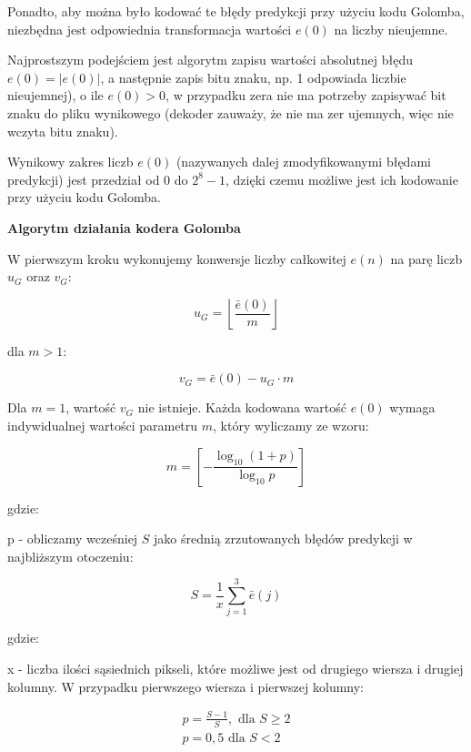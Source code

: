 \documentclass{article}
\begin{document}
Ponadto, aby można było kodować te błędy predykcji przy użyciu kodu Golomba, niezbędna jest odpowiednia transformacja wartości $e(0)$ na liczby nieujemne.

Najprostszym podejściem jest algorytm zapisu wartości absolutnej błędu $e(0)=|e(0)|$, a następnie zapis bitu znaku, np. 1 odpowiada liczbie nieujemnej), o ile $e(0)>0$, w przypadku zera nie ma potrzeby zapisywać bit znaku do pliku wynikowego (dekoder zauważy, że nie ma zer ujemnych, więc nie wczyta bitu znaku).

Wynikowy zakres liczb $e(0)$ (nazywanych dalej zmodyfikowanymi błędami predykcji) jest przedział od $0$ do $2^8 - 1$, dzięki czemu możliwe jest ich kodowanie przy użyciu kodu Golomba.


\textbf{Algorytm działania kodera Golomba}

W pierwszym kroku wykonujemy konwersje liczby całkowitej $e(n)$ na parę liczb $u_G$ oraz $v_G$:
  
\begin{equation}
u_{G}=\left\lfloor\frac{\bar{e}(0)}{m}\right\rfloor
\end{equation}	
  
dla $m > 1$:
  
\begin{equation}
v_{G}=\bar{e}(0)-u_{G} \cdot m
\end{equation}	
  
Dla $m = 1$, wartość $v_G$ nie istnieje. Każda kodowana wartość $e(0)$ wymaga indywidualnej wartości parametru $m$, który wyliczamy ze wzoru:
  
\begin{equation}
m=\left[-\frac{\log_{10}(1+p)}{\log_{10} p}\right]
\end{equation}
  
gdzie:

p - obliczamy wcześniej $S$ jako średnią zrzutowanych błędów predykcji w najbliższym otoczeniu:
  
\begin{equation}
S=\frac{1}{x} \sum_{j=1}^{3} \bar{e}(j)
\end{equation}
  
gdzie:
  
x - liczba ilości sąsiednich pikseli, które możliwe jest od drugiego wiersza i drugiej kolumny. W przypadku pierwszego wiersza i pierwszej kolumny:

\begin{equation}
\begin{array}{l}
p=\frac{S-1}{S}, \text { dla } S \geq 2 \\
p=0,5 \text { dla } S<2
\end{array}
\end{equation}
\end{document}
